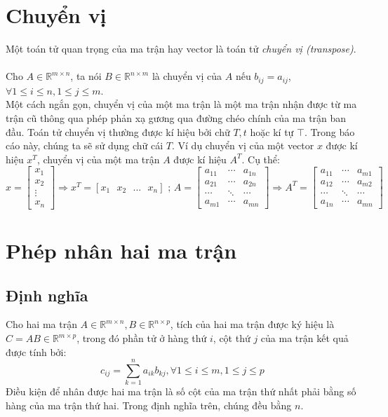 \documentclass[12pt,a4paper]{report}
\begin{document}
		\section{Chuyển vị}
	Một toán tử quan trọng của ma trận hay vector là toán tử \textit{chuyển vị (transpose)}.\\\\
	Cho $A \in \mathbb{R}^{m \times n}$, ta nói $B \in \mathbb{R}^{n \times m}$ là chuyển vị của $A$ nếu $b_{ij} = a_{ij}$, $\forall 1 \leq i \leq n, 1 \leq j \leq m$.\\Một cách ngắn gọn, chuyển vị của một ma trận là một ma trận nhận được từ ma trận cũ thông qua phép phản xạ gương qua đường chéo chính của ma trận ban đầu. Toán tử chuyển vị thường được kí hiệu bởi chữ $T, t$ hoặc kí tự $\top$. Trong báo cáo này, chúng ta sẽ sử dụng chữ cái $T$. Ví dụ chuyển vị của một vector $x$ được kí hiệu $x^T$, chuyển vị của một ma trận $A$ được kí hiệu $A^T$. Cụ thể: $$x = 
	\begin{bmatrix}
	x_1\\x_2\\ \vdots\\x_n
	\end{bmatrix} \Rightarrow x^T = [x_1 \text{ } x_2 \text{ } ... \text{ } x_n] \text{ ; }  A = \begin{bmatrix}
	a_{11} &\cdots &a_{1n}\\	a_{21}&\cdots &a_{2n}\\\cdots & \ddots & \cdots\\a_{m1}&\cdots&a_{mn}
	\end{bmatrix} \Rightarrow A^T = \begin{bmatrix}
	a_{11} &\cdots &a_{m1}\\	a_{12} &\cdots &a_{m2}\\\cdots & \ddots & \cdots\\a_{1n}&\cdots&a_{mn}
	\end{bmatrix}$$
	\section{Phép nhân hai ma trận}
\subsection{Định nghĩa}
Cho hai ma trận $A \in \mathbb{R}^{m \times n}, B \in \mathbb{R}^{n \times p}$, tích của hai ma trận được ký hiệu là $C = AB \in \mathbb{R}^{m \times p}$, trong đó phần tử ở hàng thứ $i$, cột thứ $j$ của ma trận kết quả được tính bởi:
\begin{equation}
c_{ij} = \sum^{n}_{k=1} a_{ik}b_{kj}, \forall 1 \leq i \leq m, 1 \leq j \leq p
\end{equation}
Điều kiện để nhân được hai ma trận là số cột của ma trận thứ nhất phải bằng số hàng của ma trận thứ hai. Trong định nghĩa trên, chúng đều bằng $n$.
\end{document}

